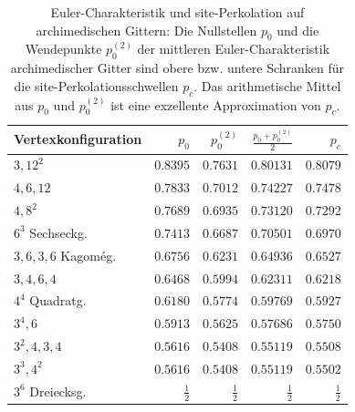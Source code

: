 \begin{table}[htbp]
\centering
  \begin{tabular}{|l|r|r|r||r|}
    \hline
    Vertexkonfiguration &$p_0$ &$p_0^{(2)}$ &$\frac{p_0+p_0^{(2)}}{2}$& $p_c$ \cite{Suding:99} \\ \hline
    \hline

    $3,12^2$ &$0.8395$ &$0.7631$&$0.80131$&$0.8079$ \\ \hline

    $4,6,12$&$0.7833$ &$0.7012$ &$0.74227$&$0.7478$\\ \hline

    $4,8^2$&$0.7689$ &$0.6935$ &$0.73120$&$0.7292$\\ \hline

    $6^3$ Sechseckg. &$0.7413$&$0.6687$ &$0.70501$&$0.6970$\\ \hline

    $3,6,3,6$ Kagom\'eg.&$0.6756$&$0.6231$ &$0.64936$&$0.6527$ \\ \hline

    $3,4,6,4$ &$0.6468$&$0.5994$ &$0.62311$&$0.6218$ \\ \hline

    $4^4$ Quadratg.&$0.6180$&$0.5774$ &$0.59769$&$0.5927$\\ \hline

    $3^4,6$  &$0.5913$&$0.5625$  &$0.57686$& $0.5750$\\ \hline

    $3^2,4,3,4$ &$0.5616$ &$0.5408$ &$0.55119$&$0.5508$ \\ \hline

    $3^3,4^2$ &$0.5616$&$0.5408$ &$0.55119$&$0.5502$  \\ \hline

    $3^6$ Dreiecksg. &$\frac{1}{2}$&$\frac{1}{2}$&$\frac{1}{2}$ &$\frac{1}{2}$\\ \hline

    \hline
  \end{tabular}
  \caption{Euler-Charakteristik und site-Perkolation auf archimedischen Gittern: Die Nullstellen $p_0$ und die Wendepunkte $p_0^{(2)}$ der mittleren Euler-Charakteristik archimedischer Gitter sind obere bzw. untere Schranken f\"ur die site-Perkolationsschwellen $p_c$. Das arithmetische Mittel aus $p_0$ und $p_0^{(2)}$ ist eine exzellente Approximation von $p_c$.}
  \label{tab:archisite}
\end{table}
